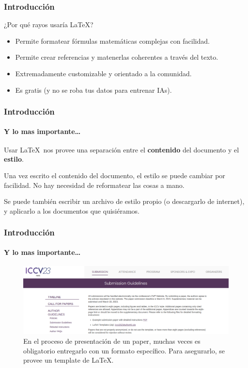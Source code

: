 \begin{frame}
    \frametitle{Introducción}
    \begin{tcolorbox}[colframe=color1]
        \begin{center}
            ¿Por qué rayos usaría \LaTeX ?
        \end{center}
    \end{tcolorbox}

    \begin{itemize}
        \item Permite formatear fórmulas matemáticas complejas con facilidad.
        \item Permite crear referencias y matenerlas coherentes a través del texto.
        \item Extremadamente customizable y orientado a la comunidad.
        \item Es gratis (y no se roba tus datos para entrenar IAs).
    \end{itemize}
\end{frame}

\begin{frame}
    \frametitle{Introducción}
    \framesubtitle{Y lo mas importante\dots}

    Usar \LaTeX\ nos provee una separación entre el \textbf{contenido} del documento y el \textbf{estilo}.

    Una vez escrito el contenido del documento, el estilo se puede cambiar por facilidad. No hay necesidad de reformatear las cosas a mano.
    
    Se puede también escribir un archivo de estilo propio (o descargarlo de internet), y aplicarlo a los documentos que quisiéramos.
    
\end{frame}

\begin{frame}
    \frametitle{Introducción}
    \framesubtitle{Y lo mas importante\dots}
    \begin{figure}[h]
        \centering
        \includegraphics[width=\textwidth]{../images/submission.png}
        \caption{En el proceso de presentación de un paper, muchas veces es obligatorio entregarlo con un formato específico. Para asegurarlo, se provee un template de \LaTeX.}
    \end{figure}
\end{frame}

